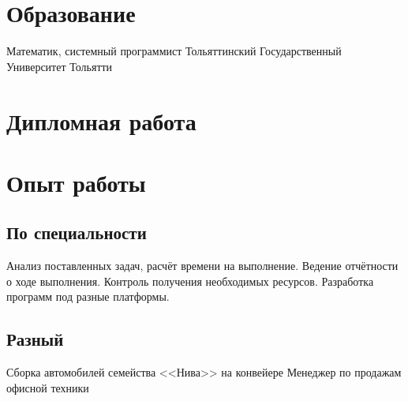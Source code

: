\documentclass[11pt,a4paper,russian]{moderncv}
\begin{document}
\maketitle


\section{Образование}
  {Математик, системный программист}
  {Тольяттинский Государственный Университет}
  {Тольятти}
  {}
  {}


\section{Дипломная работа}


\section{Опыт работы}

\subsection{По специальности}
    {Анализ поставленных задач, расчёт времени на выполнение.
     Ведение отчётности о ходе выполнения.
     Контроль получения необходимых ресурсов.
     Разработка программ под разные платформы.}

\subsection{Разный}
    {Сборка автомобилей семейства <<Нива>> на конвейере}
    {Менеджер по продажам офисной техники}
\end{document}
